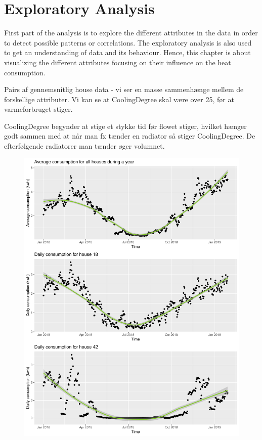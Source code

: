 \chapter{Exploratory Analysis}
First part of the analysis is to explore the different attributes in the data in order to detect possible patterns or correlations. The exploratory analysis is also used to get an understanding of data and its behaviour. Hence, this chapter is about visualizing the different attributes focusing on their influence on the heat consumption. 


Pairs af gennemsnitlig house data - vi ser en masse sammenhænge mellem de forskellige attributer. Vi kan se at CoolingDegree skal være over 25, før at varmeforbruget stiger.

CoolingDegree begynder at stige et stykke tid før flowet stiger, hvilket hænger godt sammen med at når man fx tænder en radiator så stiger CoolingDegree. De efterfølgende radiatorer man tænder øger volumnet. 
\begin{figure}[H]
    \centering \includegraphics[width=0.75.\textwidth]{../../../figures/daily_cons.pdf}
    \caption{}
    \label{fig:}
\end{figure}


